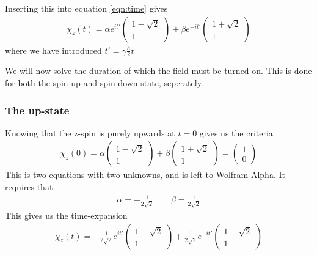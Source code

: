 \documentclass[12p,a4paper]{article}
\newcommand{\0}{\ket{0}}
\newcommand{\1}{\ket{1}}
\renewcommand{\exp}{e^}
\begin{document}
Inserting this into equation \ref{eqn:time} gives
\begin{align*}
    \chi_z(t) = \alpha \exp{it'}\begin{pmatrix} 1 - \sqrt{2} \\ 1 \end{pmatrix}  + \beta \exp{-it'}\begin{pmatrix} 1 + \sqrt{2} \\ 1 \end{pmatrix}
\end{align*}
where we have introduced $t' = \gamma\frac{h}{2}t$

We will now solve the duration of which the field must be turned on. This is done for both the spin-up and spin-down state, seperately.


\subsubsection*{The up-state}
Knowing that the z-spin is purely upwards at $t=0$ gives us the criteria
\begin{align*}
    \chi_z(0) = \alpha \begin{pmatrix} 1 - \sqrt{2} \\ 1 \end{pmatrix}  + \beta \begin{pmatrix} 1 + \sqrt{2} \\ 1 \end{pmatrix} = \begin{pmatrix} 1 \\ 0 \end{pmatrix}
\end{align*}
This is two equations with two unknowns, and is left to Wolfram Alpha. It requires that
\begin{align*}
    \alpha = -\frac{1}{2\sqrt{2}}\quad\quad \beta = \frac{1}{2\sqrt{2}}
\end{align*}
This gives us the time-expansion
\begin{align*}
    \chi_z(t) = -\frac{1}{2\sqrt{2}} \exp{it'}\begin{pmatrix} 1 - \sqrt{2} \\ 1 \end{pmatrix}  + \frac{1}{2\sqrt{2}} \exp{-it'}\begin{pmatrix} 1 + \sqrt{2} \\ 1 \end{pmatrix}
\end{align*}
\end{document}
